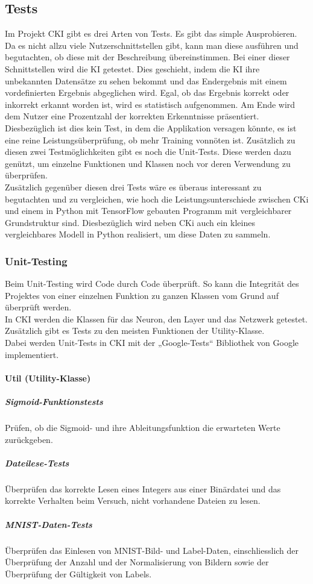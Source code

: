 \subsection{Tests}
\label{sec:DesignTests}
Im Projekt CKI gibt es drei Arten von Tests. Es gibt das simple Ausprobieren. Da es nicht allzu viele Nutzerschnittstellen gibt, kann man diese ausführen und begutachten, ob diese mit der Beschreibung übereinstimmen.
Bei einer dieser Schnittstellen wird die KI getestet. Dies geschieht, indem die KI ihre unbekannten Datensätze zu sehen bekommt und das Endergebnis mit einem vordefinierten Ergebnis abgeglichen wird.
Egal, ob das Ergebnis korrekt oder inkorrekt erkannt worden ist, wird es statistisch aufgenommen. Am Ende wird dem Nutzer eine Prozentzahl der korrekten Erkenntnisse präsentiert. Diesbezüglich ist dies kein Test, in dem die Applikation versagen könnte, es ist eine reine Leistungsüberprüfung, ob mehr Training vonnöten ist.
Zusätzlich zu diesen zwei Testmöglichkeiten gibt es noch die Unit-Tests. Diese werden dazu genützt, um einzelne Funktionen und Klassen noch vor deren Verwendung zu überprüfen.
\\
Zusätzlich gegenüber diesen drei Tests wäre es überaus interessant zu begutachten und zu vergleichen, wie hoch die Leistungsunterschiede zwischen CKi und einem in Python mit TensorFlow gebauten Programm mit vergleichbarer Grundstruktur sind. Diesbezüglich wird neben CKi auch ein kleines vergleichbares Modell in Python realisiert, um diese Daten zu sammeln.


\subsubsection{Unit-Testing}
\label{sec:DesignUnitTesting}
Beim Unit-Testing wird Code durch Code überprüft. So kann die Integrität des Projektes von einer einzelnen Funktion zu ganzen Klassen vom Grund auf überprüft werden.
\\
In CKI werden die Klassen für das Neuron, den Layer und das Netzwerk getestet. Zusätzlich gibt es Tests zu den meisten Funktionen der Utility-Klasse.
\\
Dabei werden Unit-Tests in CKI mit der „Google-Tests“ Bibliothek von Google implementiert.

\paragraph{Util (Utility-Klasse)}
\label{sec:DesignUtilUtilityKlasse}
\subparagraph{Sigmoid-Funktionstests}
\label{sec:DesignSigmoidFunktionstests}
Prüfen, ob die Sigmoid- und ihre Ableitungsfunktion die erwarteten Werte zurückgeben.
\subparagraph{Dateilese-Tests}
\label{sec:DesignDateileseTests}
Überprüfen das korrekte Lesen eines Integers aus einer Binärdatei und das korrekte Verhalten beim Versuch, nicht vorhandene Dateien zu lesen. 
\subparagraph{MNIST-Daten-Tests}
\label{sec:DesignMNISTDatenTests}
Überprüfen das Einlesen von MNIST-Bild- und Label-Daten, einschliesslich der Überprüfung der Anzahl und der Normalisierung von Bildern sowie der Überprüfung der Gültigkeit von Labels.  

